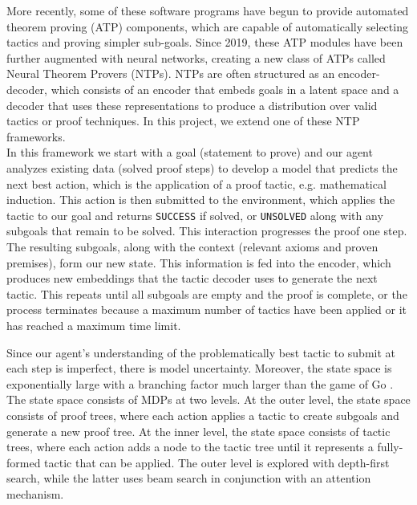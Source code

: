 \documentclass{article}
\begin{document}
More recently, some of these software programs have begun to provide automated theorem proving (ATP) components, which are capable of automatically selecting tactics and proving simpler sub-goals. Since 2019, these ATP modules have been further augmented with neural networks, creating a new class of ATPs called Neural Theorem Provers (NTPs). NTPs are often structured as an encoder-decoder, which consists of an encoder that embeds goals in a latent space and a decoder that uses these representations to produce a distribution over valid tactics or proof techniques. In this project, we extend one of these NTP frameworks. \\

In this framework we start with a goal (statement to prove) and our agent analyzes existing data (solved proof steps) to develop a model that predicts the next best action, which is the application of a proof tactic, e.g. mathematical induction. This action is then submitted to the environment, which applies the tactic to our goal and returns \texttt{SUCCESS} if solved, or \texttt{UNSOLVED} along with any subgoals that remain to be solved. This interaction progresses the proof one step. The resulting subgoals, along with the context (relevant axioms and proven premises), form our new state. This information is fed into the encoder, which produces new embeddings that the tactic decoder uses to generate the next tactic. This repeats until all subgoals are empty and the proof is complete, or the process terminates because a maximum number of tactics have been applied or it has reached a maximum time limit.

Since our agent's understanding of the problematically best tactic to submit at each step is imperfect, there is model uncertainty. Moreover, the state space is exponentially large with a branching factor much larger than the game of Go \cite{alphago}. The state space consists of MDPs at two levels. At the outer level, the state space consists of proof trees, where each action applies a tactic to create subgoals and generate a new proof tree. At the inner level, the state space consists of tactic trees, where each action adds a node to the tactic tree until it represents a fully-formed tactic that can be applied. The outer level is explored with depth-first search, while the latter uses beam search in conjunction with an attention mechanism.

\end{document}
